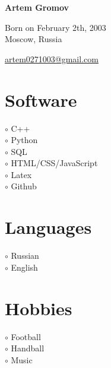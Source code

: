 \documentclass[a4paper,10pt]{article}
\newcommand{\MySkip}{
\vskip12pt
}
\begin{document}
\thispagestyle{empty}

\begin{adjustbox}{valign=t}
\begin{minipage}{0.3\textwidth}
\begin{center}

{\LARGE \bfseries Artem Gromov}

\MySkip

Born on February 2th, 2003\\
Moscow, Russia \\

\MySkip

\href{mailto:artem0271003@gmail.com}{artem0271003@gmail.com} \\

\end{center}

\vfill

\section*{Software}
\raggedright
\textcolor{ColorOne}{$\circ$} C++\\
\textcolor{ColorOne}{$\circ$} Python\\
\textcolor{ColorOne}{$\circ$} SQL \\
\textcolor{ColorOne}{$\circ$} HTML/CSS/JavaScript \\
\textcolor{ColorOne}{$\circ$} Latex \\
\textcolor{ColorOne}{$\circ$} Github

\vfill
\section*{Languages}
\raggedright
\textcolor{ColorOne}{$\circ$} Russian\\
\textcolor{ColorOne}{$\circ$} English

\vfill

\section*{Hobbies}
\raggedright
\textcolor{ColorOne}{$\circ$} Football\\
\textcolor{ColorOne}{$\circ$} Handball\\
\textcolor{ColorOne}{$\circ$} Music

\vfill

\vfill
\end{minipage}
\end{adjustbox}
\end{document}

